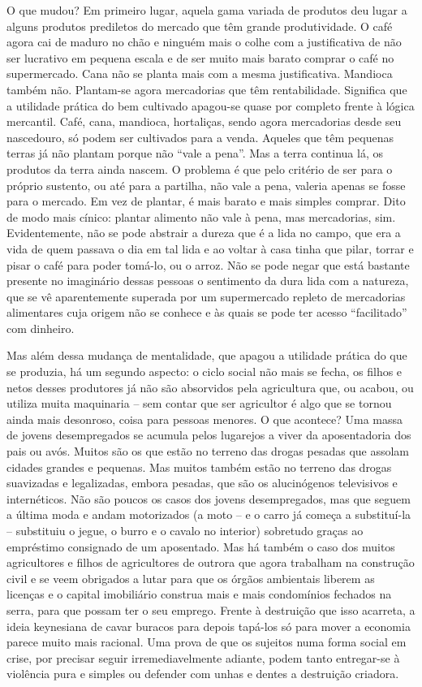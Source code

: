 O que mudou? Em primeiro lugar, aquela gama variada de produtos deu
lugar a alguns produtos prediletos do mercado que têm grande
produtividade. O café agora cai de maduro no chão e ninguém mais o colhe
com a justificativa de não ser lucrativo em pequena escala e de ser
muito mais barato comprar o café no supermercado. Cana não se planta
mais com a mesma justificativa. Mandioca também não. Plantam-se agora
mercadorias que têm rentabilidade. Significa que a utilidade prática do
bem cultivado apagou-se quase por completo frente à lógica mercantil.
Café, cana, mandioca, hortaliças, sendo agora mercadorias desde seu
nascedouro, só podem ser cultivados para a venda. Aqueles que têm
pequenas terras já não plantam porque não ``vale a pena''. Mas a terra
continua lá, os produtos da terra ainda nascem. O problema é que pelo
critério de ser para o próprio sustento, ou até para a partilha, não
vale a pena, valeria apenas se fosse para o mercado. Em vez de plantar,
é mais barato e mais simples comprar. Dito de modo mais cínico: plantar
alimento não vale à pena, mas mercadorias, sim. Evidentemente, não se
pode abstrair a dureza que é a lida no campo, que era a vida de quem
passava o dia em tal lida e ao voltar à casa tinha que pilar, torrar e
pisar o café para poder tomá-lo, ou o arroz. Não se pode negar que está
bastante presente no imaginário dessas pessoas o sentimento da dura lida
com a natureza, que se vê aparentemente superada por um supermercado
repleto de mercadorias alimentares cuja origem não se conhece e às quais
se pode ter acesso ``facilitado'' com dinheiro.

Mas além dessa mudança de mentalidade, que apagou a utilidade prática do
que se produzia, há um segundo aspecto: o ciclo social não mais se
fecha, os filhos e netos desses produtores já não são absorvidos pela
agricultura que, ou acabou, ou utiliza muita maquinaria -- sem contar
que ser agricultor é algo que se tornou ainda mais desonroso, coisa para
pessoas menores. O que acontece? Uma massa de jovens desempregados se
acumula pelos lugarejos a viver da aposentadoria dos pais ou avós.
Muitos são os que estão no terreno das drogas pesadas que assolam
cidades grandes e pequenas. Mas muitos também estão no terreno das
drogas suavizadas e legalizadas, embora pesadas, que são os alucinógenos
televisivos e internéticos. Não são poucos os casos dos jovens
desempregados, mas que seguem a última moda e andam motorizados (a moto
-- e o carro já começa a substituí-la -- substituiu o jegue, o burro e o
cavalo no interior) sobretudo graças ao empréstimo consignado de um
aposentado. Mas há também o caso dos muitos agricultores e filhos de
agricultores de outrora que agora trabalham na construção civil e se
veem obrigados a lutar para que os órgãos ambientais liberem as licenças
e o capital imobiliário construa mais e mais condomínios fechados na
serra, para que possam ter o seu emprego. Frente à destruição que isso
acarreta, a ideia keynesiana de cavar buracos para depois tapá-los só
para mover a economia parece muito mais racional. Uma prova de que os
sujeitos numa forma social em crise, por precisar seguir
irremediavelmente adiante, podem tanto entregar-se à violência pura e
simples ou defender com unhas e dentes a destruição criadora.

